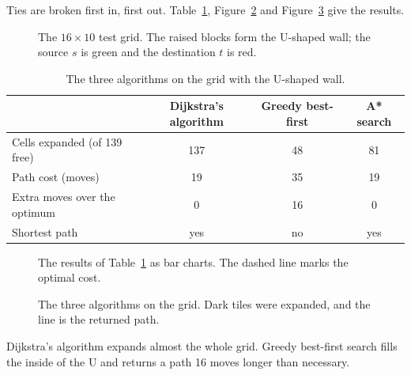 Ties are broken first in, first out. Table~\ref{tab:grid-compare},
Figure~\ref{fig:grid-bars} and Figure~\ref{fig:grid-panels} give the results.

\begin{figure}[htbp]
  \centering
  
  \caption{The $16 \times 10$ test grid. The raised blocks form the U-shaped
    wall; the source $s$ is green and the destination $t$ is red.}\label{fig:grid3d}
\end{figure}

\begin{table}[htbp]
  \centering
  \caption{The three algorithms on the grid with the U-shaped
    wall.}\label{tab:grid-compare}
  \begin{tabular}{@{}lccc@{}}
    \toprule
     & \textcolor{algdijkstra}{\textbf{Dijkstra's algorithm}}
     & \textcolor{alggreedy}{\textbf{Greedy best-first}}
     & \textcolor{algastar}{\textbf{A* search}}\\
    \midrule
    Cells expanded (of 139 free) & 137 & 48 & 81\\
    Path cost (moves)            & 19 & 35 & 19\\
    Extra moves over the optimum & 0 & 16 & 0\\
    Shortest path                & \textcolor{algastar}{yes}
                                 & \textcolor{cbRed}{no}
                                 & \textcolor{algastar}{yes}\\
    \bottomrule
  \end{tabular}
\end{table}

\begin{figure}[htbp]
  \centering
  \hfill
  \caption{The results of Table~\ref{tab:grid-compare} as bar charts. The dashed
    line marks the optimal cost.}\label{fig:grid-bars}
\end{figure}

\begin{figure}[htbp]
  \centering
  
  \caption{The three algorithms on the grid. Dark tiles were expanded, and the
    line is the returned path.}\label{fig:grid-panels}
\end{figure}

Dijkstra's algorithm expands almost the whole grid. Greedy best-first search
fills the inside of the U and returns a path 16 moves longer than necessary.

